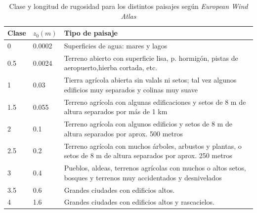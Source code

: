 \documentclass{IEEEtran}
\begin{document}
\newpage

\begin{table}[H]
    \centering
    \label{Tabla: Clase y longitud de rugosidad.}
    \caption{Clase y longitud de rugosidad para los distintos paisajes según \textit{European Wind Atlas}}
    \begin{tabular}{l l p{13cm}}
        \hline
        Clase & $z_0(m)$ & Tipo de paisaje \\
        \hline
        0 & 0.0002 & Superficies de agua: mares y lagos \\
        0.5 & 0.0024 & Terreno abierto con superficie lisa, p. hormigón, pistas de aeropuerto,hierba cortada, etc. \\
        1 & 0.03 & Tierra agrícola abierta sin valals ni setos; tal vez algunos edificios muy separados y colinas muy suave \\
        1.5 & 0.055 & Terreno agrícola con algunas edificaciones y setos de 8 m de altura separados por más de 1 km \\
        2 & 0.1 & Terreno agrícola con algunos edificios y setos de 8 m de altura separados por aprox. 500 metros \\
        2.5 & 0.2 & Terreno agrícola con muchos árboles, arbustos y plantas, o setos de 8 m de altura separados por aprox. 250 metros \\
        3 & 0.4 & Pueblos, aldeas, terrenos agrícolas con muchos o altos setos, bosques y terrenos muy accidentados y desnivelados \\
        3.5 & 0.6 & Grandes ciudades con edificios altos. \\
        4 & 1.6 & Grandes ciudades con edificios altos y rascacielos. \\ 
        \hline
    \end{tabular}
\end{table}
\end{document}
